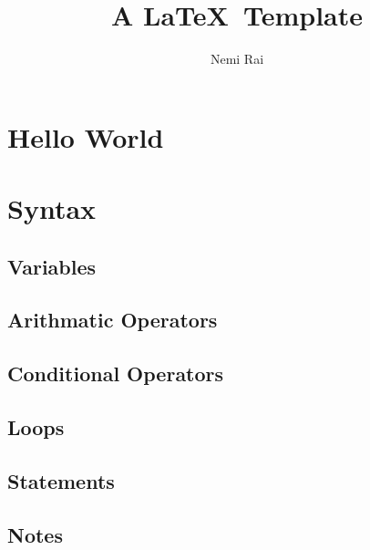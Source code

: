 \documentclass[12pt]{article}
\begin{document}
\title{A \LaTeX\ Template}
\author{Nemi Rai}
\maketitle

\pagebreak 
\tableofcontents

\section{Hello World}


\section{Syntax}
\subsection{Variables}

\subsection{Arithmatic Operators}

\subsection{Conditional Operators}

\subsection{Loops}

\subsection{Statements}

\subsection{Notes}
\end{document}
